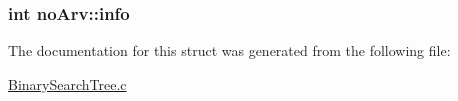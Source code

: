 \subsubsection[{\texorpdfstring{info}{info}}]{\setlength{\rightskip}{0pt plus 5cm}int no\+Arv\+::info}\hypertarget{structnoArv_a024fbe9c9e750cab832562b09d49200e}{}\label{structnoArv_a024fbe9c9e750cab832562b09d49200e}


The documentation for this struct was generated from the following file\+:\begin{DoxyCompactItemize}
\item 
\hyperlink{BinarySearchTree_8c}{Binary\+Search\+Tree.\+c}\end{DoxyCompactItemize}
